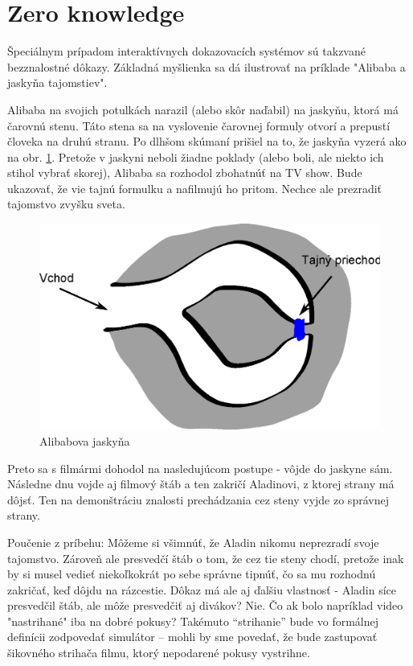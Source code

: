 \section{Zero knowledge}
Špeciálnym prípadom interaktívnych dokazovacích systémov sú takzvané
bezznalostné dôkazy. Základná myšlienka sa dá ilustrovať na príklade 
"Alibaba a jaskyňa tajomstiev".

Alibaba na svojich potulkách narazil (alebo skôr naďabil) na jaskyňu,
ktorá má čarovnú stenu. Táto stena sa na vyslovenie čarovnej formuly
otvorí a prepustí človeka na druhú stranu. Po dlhšom skúmaní
prišiel na to, že jaskyňa vyzerá ako na obr. \ref{fig:alibaba}. Pretože v
jaskyni neboli žiadne poklady (alebo boli, ale niekto ich stihol
vybrať skorej), Alibaba sa rozhodol zbohatnúť na TV show.
Bude ukazovať, že vie tajnú formulku a nafilmujú ho pritom. Nechce ale
prezradiť tajomstvo zvyšku sveta.

\begin{figure}[htp]
    \centering
    \includegraphics[scale=0.4]{img/x/alibaba}
    
    \label{fig:alibaba}
    \caption{Alibabova jaskyňa}
\end{figure}

Preto sa s filmármi dohodol na nasledujúcom postupe - vôjde do jaskyne
sám. Následne dnu vojde aj filmový štáb a ten zakričí Aladinovi, z
ktorej strany má dôjsť. Ten na demonštráciu znalosti prechádzania cez
steny vyjde zo správnej strany.

Poučenie z príbehu: Môžeme si všimnúť, že Aladin nikomu neprezradí
svoje tajomstvo. Zároveň ale presvedčí štáb o tom, že cez tie steny
chodí, pretože inak by si musel vedieť niekoľkokrát po sebe správne
tipnúť, čo sa mu rozhodnú zakričať, keď dôjdu na rázcestie.
Dôkaz má ale aj ďalšiu vlastnosť - Aladin síce presvedčil štáb, ale
môže presvedčiť aj divákov? Nie. Čo ak bolo napríklad video
"nastrihané" iba na dobré pokusy? Takémuto ``strihanie'' bude
vo formálnej definícii zodpovedať simulátor -- mohli by sme povedať,
že bude zastupovať šikovného strihača filmu, ktorý nepodarené pokusy
vystrihne.

